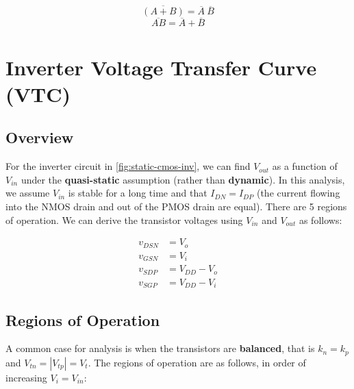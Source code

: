 \documentclass[11pt]{report}
\begin{document}
\begin{equation}
	\label{eqn:demorgan-1}
	\overline{(A + B)} = \overline{A} \ \overline{B}
\end{equation}
\begin{equation}
	\label{eqn:demorgan-2}
	\overline{AB} = \overline{A} + \overline{B}
\end{equation}

\section{Inverter Voltage Transfer Curve (VTC)}

\subsection{Overview}
For the inverter circuit in \autoref{fig:static-cmos-inv}, we can find $V_{out}$ as a function of $V_{in}$ under the \textbf{quasi-static} assumption (rather than \textbf{dynamic}). In this analysis, we assume $V_{in}$ is stable for a long time and that $I_{DN} = I_{DP}$ (the current flowing into the NMOS drain and out of the PMOS drain are equal). There are 5 regions of operation. We can derive the transistor voltages using $V_{in}$ and $V_{out}$ as follows:

\begin{align*}
	v_{DSN} &= V_o \\
	v_{GSN} &= V_i \\
	v_{SDP} &= V_{DD} - V_o \\
	v_{SGP} &= V_{DD} - V_i
\end{align*}

\subsection{Regions of Operation}
A common case for analysis is when the transistors are \textbf{balanced}, that is $k_n = k_p$ and $V_{tn}= |V_{tp}| = V_t$. The regions of operation are as follows, in order of increasing $V_{i}=V_{in}$:
\end{document}
